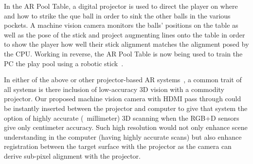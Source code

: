 \documentclass[]{spie}  %
\begin{document}
In the AR Pool Table, a digital projector is used to direct the player on where and how to strike the que ball in order to sink the other balls in the various pockets.  A machine vision camera monitors the balls' positions on the table as well as the pose of the stick and project augmenting lines onto the table in order to show the player how well their stick alignment matches the alignment posed by the CPU.  Working in reverse, the AR Pool Table is now being used to train the PC the play pool using a robotic stick~\cite{otoo16}.

In either of the above or other projector-based AR systems~\cite{otoo16, otoo16, otoo16}, a common trait of all systems is there inclusion of low-accuracy 3D vision with a commodity projector.  Our proposed machine vision camera with HDMI pass through could be instantly inserted between the projector and computer to give that system the option of highly accurate (~millimeter) 3D scanning when the RGB+D sensors give only centimeter accuracy. Such high resolution would not only enhance scene understanding in the computer (having highly accurate scans) but also enhance registration between the target surface with the projector as the camera can derive sub-pixel alignment with the projector.
%
\end{document}
